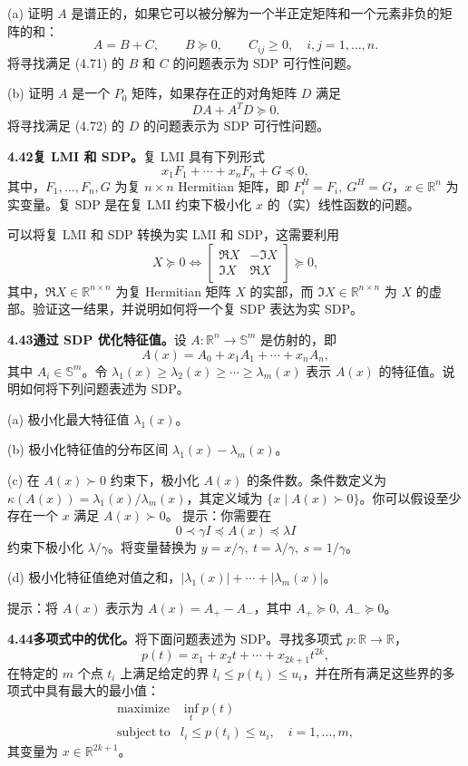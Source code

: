 \documentclass[UTF8, 12pt, fontset=fandol, oneside]{ctexart}
\begin{document}
(a) 证明 $A$ 是谱正的，如果它可以被分解为一个半正定矩阵和一个元素非负的矩阵的和：
\[
A=B+C,\qquad B\succeq0,\qquad C_{ij}\geq0,\quad i,j=1,\ldots,n.
\tag{4.71}
\]
将寻找满足 (4.71) 的 $B$ 和 $C$ 的问题表示为 SDP 可行性问题。

(b) 证明 $A$ 是一个 $P_0$ 矩阵，如果存在正的对角矩阵 $D$ 满足
\[
DA+A^TD\succeq0.
\tag{4.72}
\]
将寻找满足 (4.72) 的 $D$ 的问题表示为 SDP 可行性问题。

\noindent\textbf{4.42\quad 复 LMI 和 SDP。}\quad 复 LMI 具有下列形式
\[
x_1F_1+\cdots+x_nF_n+G\preceq0,
\]
其中，$F_1,\ldots,F_n,G$ 为复 $n\times n$ Hermitian 矩阵，即 $F_i^H=F_i,\ G^H=G$，$x\in\mathbb{R}^n$ 为实变量。复 SDP 是在复 LMI 约束下极小化 $x$ 的（实）线性函数的问题。

可以将复 LMI 和 SDP 转换为实 LMI 和 SDP，这需要利用
\[
X\succeq0\Longleftrightarrow
\begin{bmatrix}
\Re X&-\Im X\\
\Im X&\Re X
\end{bmatrix}\succeq0,
\]
其中，$\Re X\in\mathbb{R}^{n\times n}$ 为复 Hermitian 矩阵 $X$ 的实部，而 $\Im X\in\mathbb{R}^{n\times n}$ 为 $X$ 的虚部。验证这一结果，并说明如何将一个复 SDP 表达为实 SDP。

\noindent\textbf{4.43\quad 通过 SDP 优化特征值。}\quad 设 $A:\mathbb{R}^n\to\mathbb{S}^m$ 是仿射的，即
\[
A(x)=A_0+x_1A_1+\cdots+x_nA_n,
\]
其中 $A_i\in\mathbb{S}^m$。令 $\lambda_1(x)\geq\lambda_2(x)\geq\cdots\geq\lambda_m(x)$ 表示 $A(x)$ 的特征值。说明如何将下列问题表述为 SDP。

(a) 极小化最大特征值 $\lambda_1(x)$。

(b) 极小化特征值的分布区间 $\lambda_1(x)-\lambda_m(x)$。

(c) 在 $A(x)\succ0$ 约束下，极小化 $A(x)$ 的条件数。条件数定义为 $\kappa(A(x))=\lambda_1(x)/\lambda_m(x)$，其定义域为 $\{x\mid A(x)\succ0\}$。你可以假设至少存在一个 $x$ 满足 $A(x)\succ0$。
提示：你需要在
\[
0\prec\gamma I\preceq A(x)\preceq\lambda I
\]
约束下极小化 $\lambda/\gamma$。将变量替换为 $y=x/\gamma,\ t=\lambda/\gamma,\ s=1/\gamma$。

(d) 极小化特征值绝对值之和，$|\lambda_1(x)|+\cdots+|\lambda_m(x)|$。

提示：将 $A(x)$ 表示为 $A(x)=A_+-A_-$，其中 $A_+\succeq0,\ A_-\succeq0$。

\noindent\textbf{4.44\quad 多项式中的优化。}\quad 将下面问题表述为 SDP。寻找多项式 $p:\mathbb{R}\to\mathbb{R}$，
\[
p(t)=x_1+x_2t+\cdots+x_{2k+1}t^{2k},
\]
在特定的 $m$ 个点 $t_i$ 上满足给定的界 $l_i\leq p(t_i)\leq u_i$，并在所有满足这些界的多项式中具有最大的最小值：
\[
\begin{array}{ll}
\mathop{\mathrm{maximize}} & \inf_t p(t)\\
\mathrm{subject\ to} & l_i\leq p(t_i)\leq u_i,\quad i=1,\ldots,m,
\end{array}
\]
其变量为 $x\in\mathbb{R}^{2k+1}$。
\end{document}
